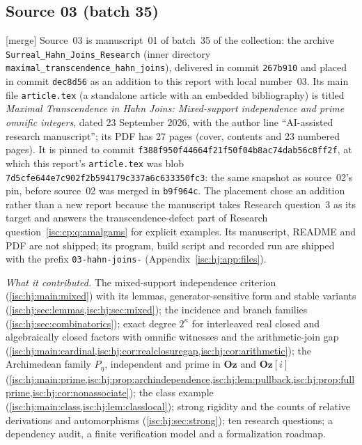 \documentclass[11pt,letterpaper]{article}
\theoremstyle{definition}
\theoremstyle{remark}
\newcommand{\Oz}{\mathbf{Oz}}
\newcommand{\mtag}{\textup{[merge]}}%
\numberwithin{equation}{section}
\begin{document}
\subsection{Source 03 (batch 35)}\label{isc:hj:app:source}

\mtag{} Source~03 is manuscript~01 of batch~35 of the collection: the
archive \nolinkurl{Surreal_Hahn_Joins_Research} (inner directory
\nolinkurl{maximal_transcendence_hahn_joins}), delivered in commit
\texttt{267b910} and placed in commit \texttt{dec8d56} as an addition to
this report with local number~03. Its main file \texttt{article.tex} (a
standalone article with an embedded bibliography) is titled
\emph{Maximal Transcendence in Hahn Joins: Mixed-support independence and
prime omnific integers}, dated 23 September 2026, with the author line
``AI-assisted research manuscript''; its PDF has 27 pages (cover, contents
and 23 numbered pages). It is pinned to commit
\nolinkurl{f388f950f44664f21f50f04b8ac74dab56c8ff2f}, at which this
report's \texttt{article.tex} was blob
\nolinkurl{7d5cfe644e7c902f2b594179c337a6c633350fc3}: the same snapshot as
source~02's pin, before source~02 was merged in \texttt{b9f964c}. The
placement chose an addition rather than a new report because the
manuscript takes Research question~3 as its target and answers the
transcendence-defect part of Research question~\ref{isc:cp:q:amalgams} for
explicit examples. Its manuscript, README and PDF are not shipped; its
program, build script and recorded run are shipped with the prefix
\texttt{03-hahn-joins-} (Appendix~\ref{isc:hj:app:files}).

\emph{What it contributed.} The mixed-support independence criterion
(\cref{isc:hj:main:mixed}) with its lemmas, generator-sensitive form and
stable variants (\cref{isc:hj:sec:lemmas,isc:hj:sec:mixed}); the incidence
and branch families (\cref{isc:hj:sec:combinatorics}); exact degree
$2^\kappa$ for interleaved real closed and algebraically closed factors
with omnific witnesses and the arithmetic-join gap
(\cref{isc:hj:main:cardinal,isc:hj:cor:realclosuregap,isc:hj:cor:arithmetic});
the Archimedean family $P_\eta$, independent and prime in $\Oz$ and $\Oz[i]$
(\cref{isc:hj:main:prime,isc:hj:prop:archindependence,isc:hj:lem:pullback,isc:hj:prop:fullprime,isc:hj:cor:nonassociate});
the class example (\cref{isc:hj:main:class,isc:hj:lem:classlocal}); strong
rigidity and the counts of relative derivations and automorphisms
(\cref{isc:hj:sec:strong}); ten research questions; a dependency audit, a
finite verification model and a formalization roadmap.
\end{document}
